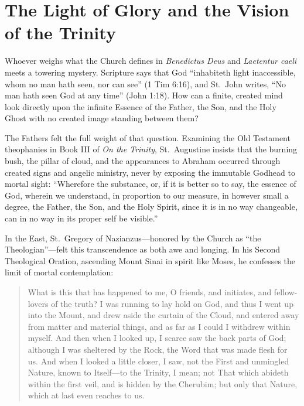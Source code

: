 \section{The Light of Glory and the Vision of the Trinity}

Whoever weighs what the Church defines in \textit{Benedictus Deus} and \textit{Laetentur caeli} meets a towering mystery. Scripture says that God ``inhabiteth light inaccessible, whom no man hath seen, nor can see'' (1 Tim 6:16), and St.\ John writes, ``No man hath seen God at any time'' (John 1:18). How can a finite, created mind look directly upon the infinite Essence of the Father, the Son, and the Holy Ghost with no created image standing between them?

The Fathers felt the full weight of that question. Examining the Old Testament theophanies in Book III of \textit{On the Trinity}, St.\ Augustine insists that the burning bush, the pillar of cloud, and the appearances to Abraham occurred through created signs and angelic ministry, never by exposing the immutable Godhead to mortal sight: ``Wherefore the substance, or, if it is better so to say, the essence of God, wherein we understand, in proportion to our measure, in however small a degree, the Father, the Son, and the Holy Spirit, since it is in no way changeable, can in no way in its proper self be visible.''

In the East, St.\ Gregory of Nazianzus---honored by the Church as ``the Theologian''---felt this transcendence as both awe and longing. In his Second Theological Oration, ascending Mount Sinai in spirit like Moses, he confesses the limit of mortal contemplation:

\begin{quote}
What is this that has happened to me, O friends, and initiates, and fellow-lovers of the truth? I was running to lay hold on God, and thus I went up into the Mount, and drew aside the curtain of the Cloud, and entered away from matter and material things, and as far as I could I withdrew within myself. And then when I looked up, I scarce saw the back parts of God; although I was sheltered by the Rock, the Word that was made flesh for us. And when I looked a little closer, I saw, not the First and unmingled Nature, known to Itself---to the Trinity, I mean; not That which abideth within the first veil, and is hidden by the Cherubim; but only that Nature, which at last even reaches to us.
\end{quote}

